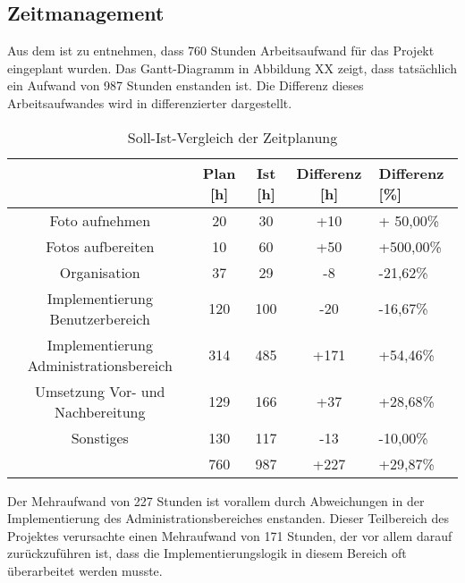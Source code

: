 \subsection{Zeitmanagement}
\label{sec:Zeitmanagement}

Aus dem  ist zu entnehmen, dass 760 Stunden Arbeitsaufwand für das Projekt
eingeplant wurden. Das Gantt-Diagramm in Abbildung XX zeigt, dass tatsächlich
ein Aufwand von 987 Stunden enstanden ist.
Die Differenz dieses Arbeitsaufwandes wird in  differenzierter dargestellt.

\begin{table}[h]
\centering
\begin{tabular}{ccccl}
\hline
\multicolumn{1}{l}{}                 & Plan {[}h{]} & Ist {[}h{]} & Differenz {[}h{]} & Differenz {[}\%{]} \\ \hline
Foto aufnehmen                       & 20           & 30          & +10               & + 50,00\%          \\ \hline
Fotos aufbereiten                    & 10           & 60          & +50               & +500,00\%          \\ \hline
Organisation                         & 37           & 29          & -8                & -21,62\%           \\ \hline
Implementierung Benutzerbereich       & 120          & 100         & -20             & -16,67\%           \\ \hline 
Implementierung Administrationsbereich & 314         & 485 & +171              & +54,46\%           \\ \hline 
Umsetzung Vor- und Nachbereitung     & 129          & 166         & +37               & +28,68\%           \\ \hline
Sonstiges                            & 130          & 117         & -13               & -10,00\%           \\ \hline
                                     & 760          & 987         & +227              & +29,87\%           \\ \hline
\end{tabular}
\caption{Soll-Ist-Vergleich der Zeitplanung}%
\label{tab:SollIstVergleichZeit}%
\end{table}


Der Mehraufwand von 227 Stunden ist vorallem durch Abweichungen in der Implementierung des Administrationsbereiches
enstanden. Dieser Teilbereich des Projektes verursachte einen Mehraufwand von
171 Stunden, der vor allem darauf zurückzuführen ist, dass die Implementierungslogik in diesem Bereich oft überarbeitet werden musste.

